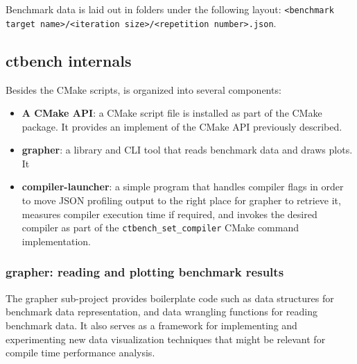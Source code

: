 \documentclass[../main]{subfiles}
\begin{document}
Benchmark data is laid out in folders under the following layout:
\lstinline{<benchmark target name>/<iteration size>/<repetition number>.json}.

\subsection{
  ctbench internals
}

Besides the CMake scripts, \ctbench is organized into several components:

\begin{itemize}

\item
\textbf{A CMake API}: a CMake script file is installed as part of the CMake
package. It provides an implement of the CMake API previously described.

\item
\textbf{grapher}: a \cpp library and CLI tool that reads benchmark data
and draws plots. It

\item
\textbf{compiler-launcher}: a simple program that handles compiler flags in
order to move JSON profiling output to the right place for grapher
to retrieve it, measures compiler execution time if required, and invokes the
desired compiler as part of the \lstinline{ctbench_set_compiler} CMake
command implementation.

\end{itemize}

\subsubsection{
  grapher: reading and plotting benchmark results
}

The grapher sub-project provides boilerplate code such as data structures
for benchmark data representation, and data wrangling functions for reading
benchmark data. It also serves as a framework for implementing and experimenting
new data visualization techniques that might be relevant for compile time
performance analysis.
\end{document}
